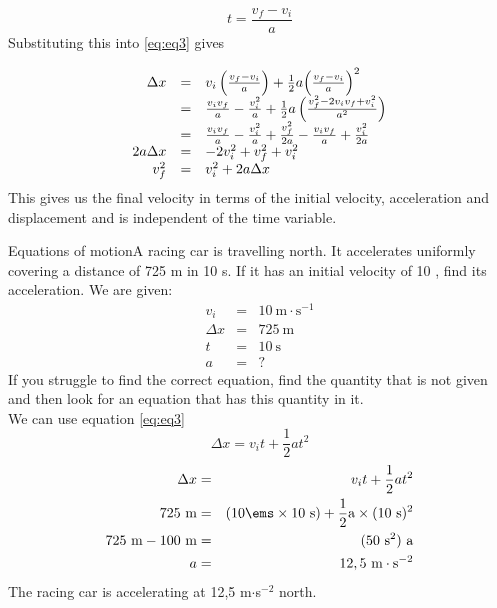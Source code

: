    \begin{equation*}
    t=\frac{{v}_{f}-{v}_{i}}{a}
      \end{equation*}
          \label{m38796*id77132}Substituting this into  \ref{eq:eq3} gives\par 
          \label{m38796*uid139}\nopagebreak\noindent{}
            
    \begin{equation*}
    \begin{array}{ccc}\hfill \Delta x& =& {v}_{i}\left(\frac{{v}_{f}-{v}_{i}}{a}\right)+\frac{1}{2}a{\left(\frac{{v}_{f}-{v}_{i}}{a}\right)}^{2}\hfill \\ & =& \frac{{v}_{i}{v}_{f}}{a}-\frac{v_{i}^{2}}{a}+\frac{1}{2}a\left(\frac{v_{f}^{2}-2{v}_{i}{v}_{f}+v_{i}^{2}}{{a}^{2}}\right)\hfill \\ & =& \frac{{v}_{i}{v}_{f}}{a}-\frac{v_{i}^{2}}{a}+\frac{v_{f}^{2}}{2a}-\frac{{v}_{i}{v}_{f}}{a}+\frac{v_{i}^{2}}{2a}\hfill \\ \hfill 2a\Delta x& =& -2v_{i}^{2}+v_{f}^{2}+v_{i}^{2}\hfill \\ \hfill v_{f}^{2}& =& v_{i}^{2}+2a\Delta x\hfill \end{array}
      \end{equation*}
          \label{m38796*id77586}This gives us the final velocity in terms of the initial velocity, acceleration and displacement and is independent of the time variable.\par 
\label{m38796*secfhsst!!!underscore!!!id4852}\vspace{.5cm} 
      \noindent
\begin{wex}{Equations of motion}{A racing car is travelling north. It accelerates uniformly  covering a distance of 725 m in 10 s. If it has an initial velocity of 10 \ms, find its acceleration.}
{ We are given:
\begin{eqnarray*}
v_i&=&10\ \text{m} \cdot \text{s}^{-1}\\
\Delta x&=&725\ \text{m}\\
t&=&10\ \text{s}\\
a&=&?
\end{eqnarray*}
If you struggle to find the correct equation, find the quantity that is not given and then look for an equation that has this quantity in it.\\
We can use equation \ref{eq:eq3}
\begin{displaymath}
\Delta x=v_it +\frac{1}{2}at^2
\end{displaymath}
\begin{eqnarray*}
\Delta x &=& v_it +\frac{1}{2}at^2\\
725\text{~m} &=& (10\ems \times 10\text{~s}) + \frac{1}{2} \text{a} \times (10\text{~s})^2\\
725\text{~m} - 100\text{~m} &=& (50\text{~s}^2)~ \text{a}\\
a &=& 12,5~ \text{m} \cdot\text{s}^{-2}
\end{eqnarray*}
The racing car is accelerating at 12,5 m$\cdot$s$^{-2}$ north.}
\end{wex}
